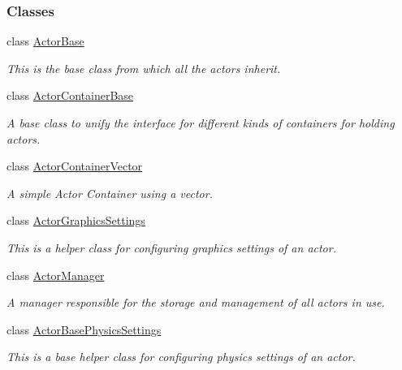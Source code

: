 \subsubsection*{Classes}
\begin{DoxyCompactItemize}
\item 
class \hyperlink{classphys_1_1ActorBase}{ActorBase}
\begin{DoxyCompactList}\small\item\em This is the base class from which all the actors inherit. \item\end{DoxyCompactList}\item 
class \hyperlink{classphys_1_1ActorContainerBase}{ActorContainerBase}
\begin{DoxyCompactList}\small\item\em A base class to unify the interface for different kinds of containers for holding actors. \item\end{DoxyCompactList}\item 
class \hyperlink{classphys_1_1ActorContainerVector}{ActorContainerVector}
\begin{DoxyCompactList}\small\item\em A simple Actor Container using a vector. \item\end{DoxyCompactList}\item 
class \hyperlink{classphys_1_1ActorGraphicsSettings}{ActorGraphicsSettings}
\begin{DoxyCompactList}\small\item\em This is a helper class for configuring graphics settings of an actor. \item\end{DoxyCompactList}\item 
class \hyperlink{classphys_1_1ActorManager}{ActorManager}
\begin{DoxyCompactList}\small\item\em A manager responsible for the storage and management of all actors in use. \item\end{DoxyCompactList}\item 
class \hyperlink{classphys_1_1ActorBasePhysicsSettings}{ActorBasePhysicsSettings}
\begin{DoxyCompactList}\small\item\em This is a base helper class for configuring physics settings of an actor. \item\end{DoxyCompactList}\item 

\end{DoxyCompactItemize}
